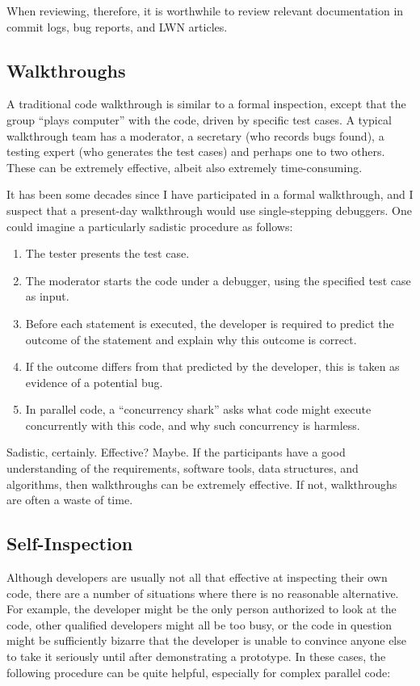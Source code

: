 When reviewing, therefore, it is worthwhile to review relevant documentation
in commit logs, bug reports, and LWN articles.

\subsection{Walkthroughs}
\label{sec:debugging:Walkthroughs}

A traditional code walkthrough is similar to a formal inspection,
except that the group
``plays computer'' with the code, driven by specific test cases.
A typical walkthrough team has a moderator, a secretary (who records
bugs found), a testing expert (who generates the test cases) and
perhaps one to two others.
These can be extremely effective, albeit also extremely time-consuming.

It has been some decades since I have participated in a formal
walkthrough, and I suspect that a present-day walkthrough would
use single-stepping debuggers.
One could imagine a particularly sadistic procedure as follows:

\begin{enumerate}
\item	The tester presents the test case.
\item	The moderator starts the code under a debugger, using the
	specified test case as input.
\item	Before each statement is executed, the developer is required
	to predict the outcome of the statement and explain why
	this outcome is correct.
\item	If the outcome differs from that predicted by the developer,
	this is taken as evidence of a potential bug.
\item	In parallel code, a ``concurrency shark'' asks what code
	might execute concurrently with this code, and why such
	concurrency is harmless.
\end{enumerate}

Sadistic, certainly.
Effective?
Maybe.
If the participants have a good understanding of the requirements,
software tools, data structures, and algorithms, then walkthroughs
can be extremely effective.
If not, walkthroughs are often a waste of time.

\subsection{Self-Inspection}
\label{sec:debugging:Self-Inspection}

Although developers are usually not all that effective at inspecting
their own code, there are a number of situations where there is no
reasonable alternative.
For example, the developer might be the only person authorized to look
at the code, other qualified developers might all be too busy, or
the code in question might be sufficiently bizarre that the developer
is unable to convince anyone else to take it seriously until after
demonstrating a prototype.
In these cases, the following procedure can be quite helpful,
especially for complex parallel code:

